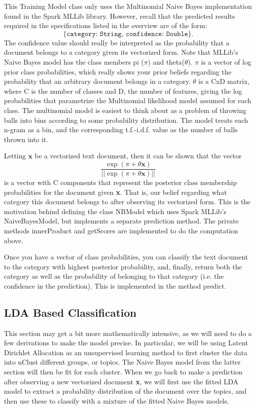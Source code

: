 \documentclass[a4paper,12pt]{article}
\renewcommand{\bf}[1]{\textbf{#1}}
\renewcommand{\tt}[1]{\texttt{#1}}
\newcommand{\3}{\left}
\newcommand{\4}{\right}
\renewcommand{\-}[1]{{}^{-#1}}
\begin{document}
This Training Model class only uses the Multinomial Naive Bayes implementation
found in the Spark MLLib library. However, recall that the predicted results required in the specifications listed in the overview are of the form:
$$
\tt{\{category: String, confidence: Double\}}.
$$
The confidence value should really be interpreted as the probability that a document belongs to a category given its vectorized form. Note that MLLib's Naive Bayes model has the class members pi ($\pi$) and theta($\theta$). $\pi$ is a vector of log prior class probabilities, which really shows your prior beliefs regarding the probability that an arbitrary document belongs in a category. $\theta$ is a CxD matrix, where C is the number of classes and D, the number of features, giving the log probabilities that parametrize the Multinomial likelihood model assumed for each class. The multinomial model is easiest to think about as a problem of throwing balls into bins according to some probability distribution. The model treats each n-gram as a bin, and the corresponding t.f.-i.d.f. value as the number of balls thrown into it. 

Letting $\mathbf{x}$ be a vectorized text document, then it can be shown that the vector 
$$
\frac{\exp\3(\pi + \theta\bf{x}\4)}{||\exp\3(\pi + \theta\bf{x}\4)||}
$$
is a vector with C components that represent the posterior class membership probabilities for the document given \bf{x}. That is, our belief regarding what category this document belongs to after observing its vectorized form. This is the motivation behind defining the class NBModel which uses Spark MLLib's NaiveBayesModel, but implements a separate prediction method. The private methods innerProduct and getScores are implemented to do the computation above. 

Once you have a vector of class probabilities, you can classify the text document to the category with highest posterior probability, and, finally, return both the category as well as the probability of belonging to that category (i.e. the confidence in the prediction). This is implemented in the method predict.

\subsection*{LDA Based Classification}

This section may get a bit more mathematically intensive, as we will need to do a few derivations to make the model precise. In particular, we will be using Latent Dirichlet Allocation as an unsupervised learning method 
to first cluster the data into nClust different groups, or topics. The Naive Bayes model from the latter section will then be fit for each cluster. When we go back to make a prediction after observing a new vectorized document \bf{x}, we will first use the fitted LDA model to extract a probability distribution of the document over the topics, and then use these to classify with a mixture of the fitted Naive Bayes models.
\end{document}
